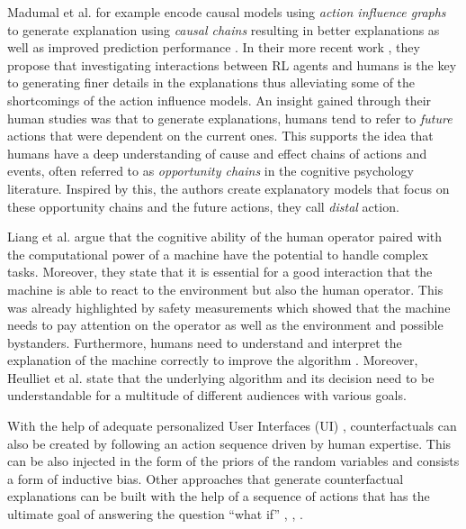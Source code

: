 \documentclass[twoside,11pt]{article}
\begin{document}
Madumal et al. for example encode causal models using \emph{action influence graphs} to generate explanation using \emph{causal chains} resulting in better explanations as well as improved prediction performance \cite{MadumalEtAl:2020:CausalRLCFs}. In their more recent work \cite{Madumal:2020:DistalEF}, they propose that investigating interactions between RL agents and humans is the key to generating finer details in the explanations thus alleviating some of the shortcomings of the action influence models. An insight gained through their human studies was that to generate explanations, humans tend to refer to \emph{future} actions that were dependent on the current ones. This supports the idea that humans have a deep understanding of cause and effect chains of actions and events, often referred to as \emph{opportunity chains} in the cognitive psychology literature. Inspired by this, the authors create explanatory models that focus on these opportunity chains and the future actions, they call \emph{distal} action. 

Liang et al. \cite{LiangEtAl:2017:HITLReinforcementLearn} argue that the cognitive ability of the human operator paired with the computational power of a machine have the potential to handle complex tasks. Moreover, they state that it is essential for a good interaction that the machine is able to react to the environment but also the human operator. This was already highlighted by safety measurements which showed that the machine needs to pay attention on the operator as well as the environment and possible bystanders. Furthermore, humans need to understand and interpret the explanation of the machine correctly to improve the algorithm \cite{heuillet2021explainability}. Moreover, Heulliet et al. \cite{heuillet2021explainability} state that the underlying algorithm and its decision need to be understandable for a multitude of different audiences with various goals.


With the help of adequate personalized User Interfaces (UI) \cite{Sun:2021:TopologyPerturbationGNNs}, counterfactuals can also be created by following an action sequence driven by human expertise. This can be also injected in the form of the priors of the random variables and consists a form of inductive bias.  Other approaches that generate counterfactual explanations \cite{HolzingerEtAl:2021:MultiModalCausabilityGNN} can be built with the help of a sequence of actions that has the ultimate goal of answering the question ``what if'' \cite{Pearl:2018:CausalCounterfactualInference}, \cite{Pearl:2018:TheBookOfWhy}, \cite{Marletto:2021:ScienceCanCant}.
\end{document}
